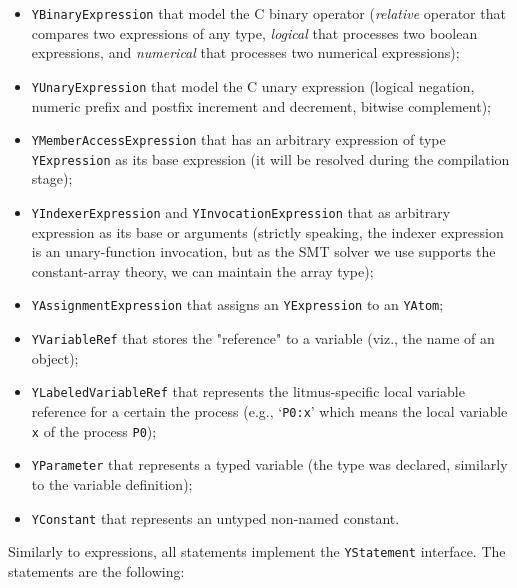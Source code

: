 \begin{itemize}%
  \item \texttt{YBinaryExpression} that model the C binary operator (\textit{relative} operator that compares two expressions of any type, \textit{logical} that processes two boolean expressions, and \textit{numerical} that processes two numerical expressions);

  \item \texttt{YUnaryExpression} that model the C unary expression (logical negation, numeric prefix and postfix increment and decrement, bitwise complement);

  \item \texttt{YMemberAccessExpression} that has an arbitrary expression of type \texttt{YExpression} as its base expression (it will be resolved during the compilation stage);%

  \item \texttt{YIndexerExpression} and \texttt{YInvocationExpression} that as arbitrary expression as its base or arguments (strictly speaking, the indexer expression is an unary-function invocation, but as the SMT solver we use supports the constant-array theory, we can maintain the array type);

  \item \texttt{YAssignmentExpression} that assigns an \texttt{YExpression} to an \texttt{YAtom};

  \item \texttt{YVariableRef} that stores the "reference" to a variable (viz., the name of an object);

  \item \texttt{YLabeledVariableRef} that represents the litmus-specific local variable reference for a certain the process (e.g., `\lstinline{P0:x}' which means the local variable \lstinline{x} of the process \lstinline{P0});

  \item \texttt{YParameter} that represents a typed variable (the type was declared, similarly to the variable definition);

  \item \texttt{YConstant} that represents an untyped non-named constant.
\end{itemize}

Similarly to expressions, all \ytree{} statements implement the \texttt{YStatement} interface. The statements are the following: 

